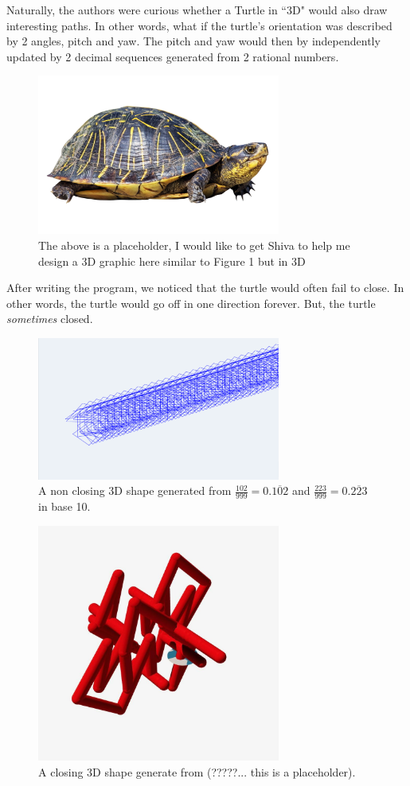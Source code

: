 \documentclass[11pt,titlepage]{article}
\begin{document}
Naturally, the authors were curious whether a Turtle in ``3D" would also draw 
interesting paths. In other words, what if the turtle's orientation was described
by 2 angles, pitch and yaw. The pitch and yaw would then by independently updated
by 2 decimal sequences generated from 2 rational numbers.
\begin{figure}[h!]
  \centering
  \includegraphics[width=8cm]{fig/turtle.png}
  \caption{The above is a placeholder, I would like to get Shiva to help me design a 3D graphic here similar to Figure 1 but in 3D}
\end{figure}
After writing the program, we noticed that the turtle would often fail
to close. In other words, the turtle would go off in one direction forever.
But, the turtle \textit{sometimes} closed.
\begin{figure}[h!]
  \centering
  \includegraphics[width=8cm]{fig/failclose3d.png}
  \caption{A non closing 3D shape generated from $\frac{102}{999} = 0.\overline{102}$ and $\frac{223}{999} = 0.\overline{223}$ in base 10.}
\end{figure}

\begin{figure}[h!]
  \centering
  \includegraphics[width=8cm]{fig/tempclose.jpeg}
  \caption{A closing 3D shape generate from (?????... this is a placeholder).}
\end{figure}
\end{document}
